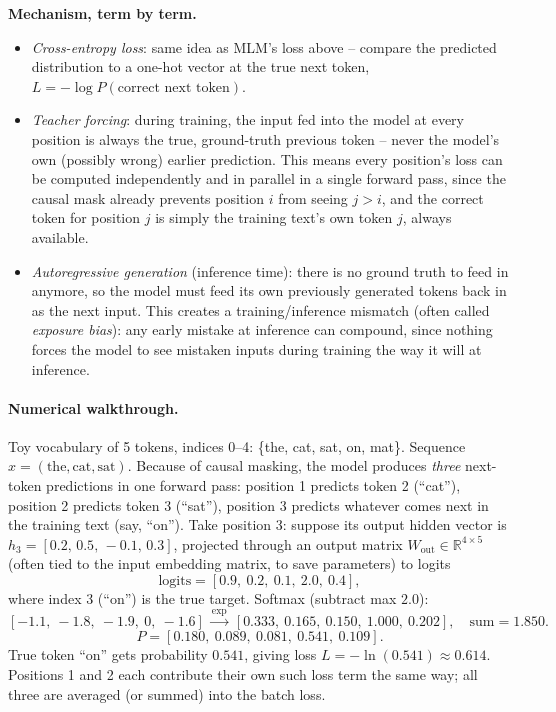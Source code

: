 \documentclass[11pt]{article}
\begin{document}
\textbf{Mechanism, term by term.}
\begin{itemize}
\item \emph{Cross-entropy loss}: same idea as MLM's loss above -- compare the predicted distribution to a one-hot vector at the true next token, $L=-\log P(\text{correct next token})$.
\item \emph{Teacher forcing}: during training, the input fed into the model at every position is always the true, ground-truth previous token -- never the model's own (possibly wrong) earlier prediction. This means every position's loss can be computed independently and in parallel in a single forward pass, since the causal mask already prevents position $i$ from seeing $j>i$, and the correct token for position $j$ is simply the training text's own token $j$, always available.
\item \emph{Autoregressive generation} (inference time): there is no ground truth to feed in anymore, so the model must feed its own previously generated tokens back in as the next input. This creates a training/inference mismatch (often called \emph{exposure bias}): any early mistake at inference can compound, since nothing forces the model to see mistaken inputs during training the way it will at inference.
\end{itemize}

\paragraph{Numerical walkthrough.} Toy vocabulary of 5 tokens, indices 0--4: \{the, cat, sat, on, mat\}. Sequence $x=(\text{the}, \text{cat}, \text{sat})$. Because of causal masking, the model produces \emph{three} next-token predictions in one forward pass: position 1 predicts token 2 (``cat''), position 2 predicts token 3 (``sat''), position 3 predicts whatever comes next in the training text (say, ``on''). Take position 3: suppose its output hidden vector is $h_3=[0.2,\,0.5,\,-0.1,\,0.3]$, projected through an output matrix $W_{\text{out}}\in\mathbb{R}^{4\times5}$ (often tied to the input embedding matrix, to save parameters) to logits
\[
\text{logits} = [0.9,\ 0.2,\ 0.1,\ 2.0,\ 0.4],
\]
where index 3 (``on'') is the true target. Softmax (subtract max $2.0$):
\[
[-1.1,\ -1.8,\ -1.9,\ 0,\ -1.6]\ \xrightarrow{\exp}\ [0.333,\ 0.165,\ 0.150,\ 1.000,\ 0.202],\quad\text{sum}=1.850.
\]
\[
P = [0.180,\ 0.089,\ 0.081,\ 0.541,\ 0.109].
\]
True token ``on'' gets probability $0.541$, giving loss $L=-\ln(0.541)\approx0.614$. Positions 1 and 2 each contribute their own such loss term the same way; all three are averaged (or summed) into the batch loss.
\end{document}
